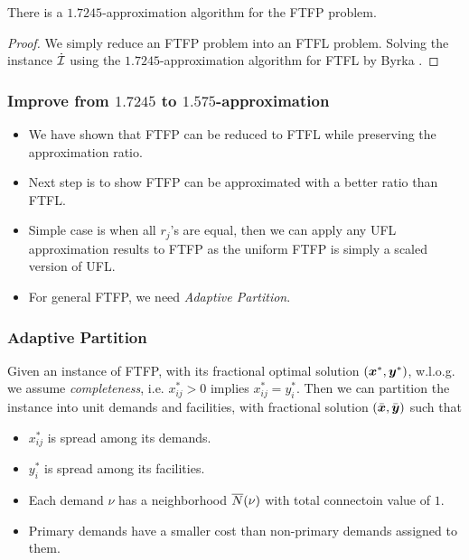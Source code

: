 \documentclass[hyperref, xcolor=dvipsnames]{beamer}
\begin{document}
\begin{frame}
  \begin{corollary}
    There is a $1.7245$-approximation algorithm for the FTFP problem.
  \end{corollary}
  \begin{proof}
    We simply reduce an FTFP problem into an FTFL problem. Solving the
    instance $\dot {\mathcal{I}}$ using the $1.7245$-approximation algorithm
    for FTFL by Byrka {\etal}.
  \end{proof}
\end{frame}

\begin{frame}
  \frametitle{Improve from $1.7245$ to $1.575$-approximation}
  \begin{itemize}
  \item We have shown that FTFP can be reduced to FTFL while
    preserving the approximation ratio.
  \item Next step is to show FTFP can be approximated with a better
    ratio than FTFL.
  \item Simple case is when all $r_j$'s are equal, then we can apply
    any UFL approximation results to FTFP as the uniform FTFP is
    simply a scaled version of UFL.
  \item For general FTFP, we need \emph{Adaptive Partition}.
  \end{itemize}
\end{frame}

\begin{frame}
  \frametitle{Adaptive Partition} 

  Given an instance of FTFP, with its fractional optimal solution
  $(\boldsymbol{x}^\ast, \boldsymbol{y}^\ast)$, w.l.o.g. we assume \emph{completeness},
  i.e. $x_{ij}^\ast > 0$ implies $x_{ij} ^\ast = y_i^\ast$.  Then we
  can partition the instance into unit demands and facilities, with
  fractional solution $(\bar{\boldsymbol{x}}, \bar{\boldsymbol{y}})$ such that
  \begin{itemize}
  \item $x_{ij}^\ast$ is spread among its demands.
  \item $y_i^\ast$ is spread among its facilities.
  \item Each demand $\nu$ has a neighborhood ${\overline{N}}(\nu)$ with total
    connectoin value of $1$.
  \item Primary demands have a smaller cost than non-primary demands
    assigned to them.
  \end{itemize}
\end{frame}
\end{document}
